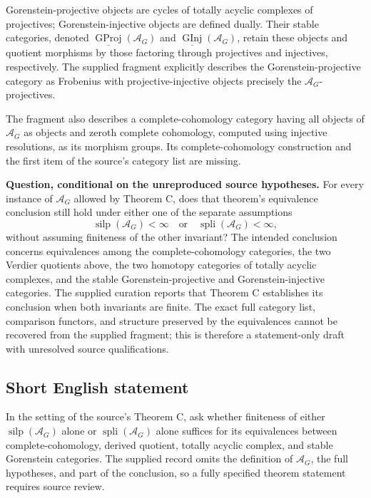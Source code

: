 \documentclass[11pt]{article}
\begin{document}
Gorenstein-projective objects are cycles of totally acyclic complexes of projectives; Gorenstein-injective objects are defined dually. Their stable categories, denoted \(\underline{\operatorname{GProj}}(\mathcal A_G)\) and \(\underline{\operatorname{GInj}}(\mathcal A_G)\), retain these objects and quotient morphisms by those factoring through projectives and injectives, respectively. The supplied fragment explicitly describes the Gorenstein-projective category as Frobenius with projective-injective objects precisely the \(\mathcal A_G\)-projectives.

The fragment also describes a complete-cohomology category having all objects of \(\mathcal A_G\) as objects and zeroth complete cohomology, computed using injective resolutions, as its morphism groups. Its complete-cohomology construction and the first item of the source's category list are missing.

\textbf{Question, conditional on the unreproduced source hypotheses.} For every instance of \(\mathcal A_G\) allowed by Theorem C, does that theorem's equivalence conclusion still hold under either one of the separate assumptions
\[
\operatorname{silp}(\mathcal A_G)<\infty
\quad\text{or}\quad
\operatorname{spli}(\mathcal A_G)<\infty,
\]
without assuming finiteness of the other invariant? The intended conclusion concerns equivalences among the complete-cohomology categories, the two Verdier quotients above, the two homotopy categories of totally acyclic complexes, and the stable Gorenstein-projective and Gorenstein-injective categories. The supplied curation reports that Theorem C establishes its conclusion when both invariants are finite. The exact full category list, comparison functors, and structure preserved by the equivalences cannot be recovered from the supplied fragment; this is therefore a statement-only draft with unresolved source qualifications.
\subsection{Short English statement}
In the setting of the source's Theorem C, ask whether finiteness of either \(\operatorname{silp}(\mathcal A_G)\) alone or \(\operatorname{spli}(\mathcal A_G)\) alone suffices for its equivalences between complete-cohomology, derived quotient, totally acyclic complex, and stable Gorenstein categories. The supplied record omits the definition of \(\mathcal A_G\), the full hypotheses, and part of the conclusion, so a fully specified theorem statement requires source review.
\end{document}
